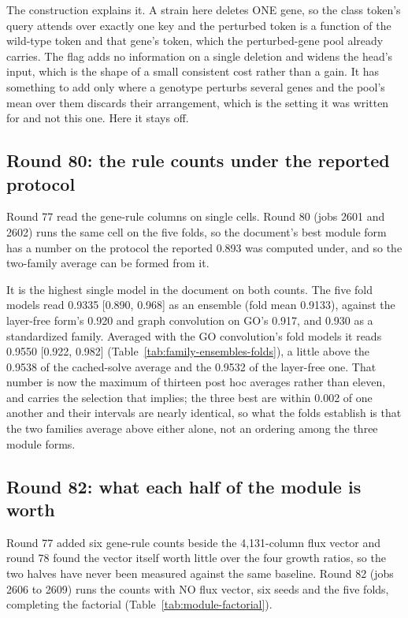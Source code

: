 The construction explains it. A strain here deletes ONE gene, so the class token's query
attends over exactly one key and the perturbed token is a function of the wild-type token
and that gene's token, which the perturbed-gene pool already carries. The flag adds no
information on a single deletion and widens the head's input, which is the shape of a
small consistent cost rather than a gain. It has something to add only where a genotype
perturbs several genes and the pool's mean over them discards their arrangement, which is
the setting it was written for and not this one. Here it stays off.



\subsection{Round 80: the rule counts under the reported protocol}
\label{sec:round80}

Round 77 read the gene-rule columns on single cells. Round 80 (jobs 2601 and 2602) runs
the same cell on the five folds, so the document's best module form has a number on the
protocol the reported 0.893 was computed under, and so the two-family average can be
formed from it.

It is the highest single model in the document on both counts. The five fold models read
0.9335 [0.890, 0.968] as an ensemble (fold mean 0.9133), against the layer-free form's
0.920 and graph convolution on GO's 0.917, and 0.930 as a standardized family. Averaged
with the GO convolution's fold models it reads 0.9550 [0.922, 0.982]
(Table~\ref{tab:family-ensembles-folds}), a little above the 0.9538 of the cached-solve
average and the 0.9532 of the layer-free one. That number is now the maximum of thirteen
post hoc averages rather than eleven, and carries the selection that implies; the three
best are within 0.002 of one another and their intervals are nearly identical, so what
the folds establish is that the two families average above either alone, not an ordering
among the three module forms.

\subsection{Round 82: what each half of the module is worth}
\label{sec:round82}

Round 77 added six gene-rule counts beside the 4,131-column flux vector and round 78 found
the vector itself worth little over the four growth ratios, so the two halves have never
been measured against the same baseline. Round 82 (jobs 2606 to 2609) runs the counts with
NO flux vector, six seeds and the five folds, completing the factorial
(Table~\ref{tab:module-factorial}).

